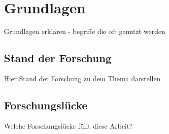 \section{Grundlagen}\label{sec:Grundlagen}
Grundlagen erklären - begriffe die oft genutzt werden

\subsection{Stand der Forschung}
Hier Stand der Forschung zu dem Thema darstellen

\subsection{Forschungslücke}
Welche Forschungslücke füllt diese Arbeit?
